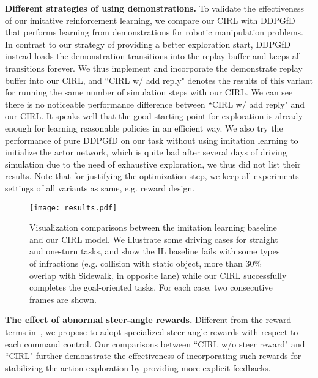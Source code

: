 \documentclass[runningheads]{llncs}
\begin{document}
\noindent\textbf{Different strategies of using demonstrations.} To validate the effectiveness of our imitative reinforcement learning, we compare our CIRL with DDPGfD~\cite{vevcerik2017leveraging} that performs learning from demonstrations for robotic manipulation problems. In contrast to our strategy of providing a better exploration start, DDPGfD instead loads the demonstration transitions into the replay buffer and keeps all transitions forever. We thus implement and incorporate the demonstrate replay buffer into our CIRL, and ``CIRL w/ add reply" denotes the results of this variant for running the same number of simulation steps with our CIRL. We can see there is no noticeable performance difference between ``CIRL w/ add reply" and our CIRL. It speaks well that the good starting point for exploration is already enough for learning reasonable policies in an efficient way. We also try the performance of pure DDPGfD on our task without using imitation learning to initialize the actor network, which is quite bad after several days of driving simulation due to the need of exhaustive exploration, we thus did not list their results. Note that for justifying the optimization step, we keep all experiments settings of all variants as same, e.g. reward design.

\begin{figure*}[!tp]
        \begin{center}
     \texttt{[image: results.pdf]}\vspace{-3mm}
            \caption{Visualization comparisons between the imitation learning baseline~\cite{dosovitskiy2017carla} and our CIRL model. We illustrate some driving cases for straight and one-turn tasks, and show the IL baseline fails with some types of infractions (e.g. collision with static object, more than 30\% overlap with Sidewalk, in opposite lane) while our CIRL successfully completes the goal-oriented tasks. For each case, two consecutive frames are shown.}\vspace{-6mm}
            \label{fig:visualresult}
        \end{center}
    \end{figure*}
    
\noindent\textbf{The effect of abnormal steer-angle rewards.} Different from the reward terms in~\cite{dosovitskiy2017carla}, we propose to adopt specialized steer-angle rewards with respect to each command control. Our comparisons between ``CIRL w/o steer reward" and ``CIRL" further demonstrate the effectiveness of incorporating such rewards for stabilizing the action exploration by providing more explicit feedbacks.
\end{document}
